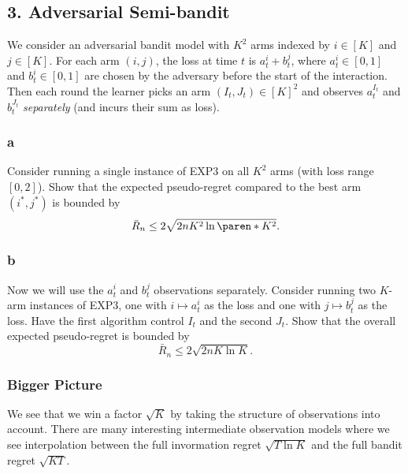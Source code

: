 \documentclass[10pt, a4paper, twoside]{amsart}
\theoremstyle{plain}
\DeclarePairedDelimiter\paren()
\begin{document}
\subsection*{3. Adversarial Semi-bandit}
We consider an adversarial bandit model with $K^2$ arms indexed by $i \in [K]$ and $j \in [K]$. For each arm $(i,j)$, the loss at time $t$ is $a_t^i + b_t^j$, where $a_t^i \in [0,1]$ and $b_t^i \in [0,1]$ are chosen by the adversary before the start of the interaction. Then each round the learner picks an arm $(I_t, J_t) \in [K]^2$ and observes $a_t^{I_t}$ and $b_t^{J_t}$ \textit{separately} (and incurs their sum as loss).
\subsubsection*{a} Consider running a single instance of EXP$3$ on all $K^2$ arms (with loss range $[0,2]$). Show that the expected pseudo-regret compared to the best arm $(i^*, j^*)$ is bounded by
\begin{equation*}
    \bar{R}_n \leq 2 \sqrt{2nK^2\ln\paren*{K^2}}.
\end{equation*}
\subsubsection*{b} Now we will use the $a_t^i$ and $b_t^j$ observations separately. Consider running two $K$-arm instances of EXP$3$, one with $i \mapsto a_t^i$ as the loss and one with $j \mapsto b_t^j$ as the loss. Have the first algorithm control $I_t$ and the second $J_t$. Show that the overall expected pseudo-regret is bounded by 
\begin{equation*}
    \bar{R}_n \leq 2 \sqrt{2nK\ln K}.
\end{equation*}
\subsubsection*{Bigger Picture} We see that we win a factor $\sqrt{K}$ by taking the structure of observations into account. There are many interesting intermediate observation models where we see interpolation between the full invormation regret $\sqrt{T \ln K}$ and the full bandit regret $\sqrt{KT}$.
\end{document}
